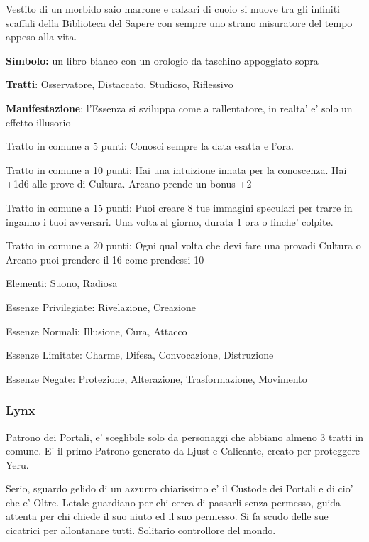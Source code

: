 \documentclass[a4paper,11pt,twoside,openany]{dndbook}
\begin{document}
{Vestito di un morbido saio marrone e calzari di cuoio si muove tra gli infiniti scaffali della Biblioteca del Sapere con sempre uno strano misuratore del tempo appeso alla vita.

\textbf{Simbolo:} un libro bianco con un orologio da taschino appoggiato
sopra

\textbf{Tratti}: Osservatore, Distaccato, Studioso, Riflessivo

\textbf{Manifestazione}: l'Essenza si sviluppa come a rallentatore, in realta' e' solo un effetto illusorio

\bigskip

Tratto in comune a 5 punti: Conosci sempre la data esatta e l'ora.

Tratto in comune a 10 punti: Hai una intuizione innata per la conoscenza. Hai +1d6 alle prove di Cultura. Arcano prende un bonus +2

Tratto in comune a 15 punti: Puoi creare 8 tue immagini speculari per trarre in inganno i tuoi avversari. Una volta al giorno, durata 1 ora o finche' colpite.

Tratto in comune a 20 punti: Ogni qual volta che devi fare una provadi Cultura o Arcano puoi prendere il 16 come prendessi 10

\bigskip

Elementi: Suono, Radiosa

\bigskip

Essenze Privilegiate: Rivelazione, Creazione

Essenze Normali: Illusione, Cura, Attacco

Essenze Limitate: Charme, Difesa, Convocazione, Distruzione

Essenze Negate: Protezione, Alterazione, Trasformazione, Movimento

\subsubsection{Lynx}

\label{lynx}

Patrono dei Portali, e' sceglibile solo da personaggi che abbiano almeno 3 tratti in comune. E' il primo Patrono generato da Ljust e Calicante, creato per proteggere Yeru.

Serio, sguardo gelido di un azzurro chiarissimo e' il Custode dei Portali e di cio' che e' Oltre. Letale guardiano per chi cerca di passarli senza permesso, guida attenta per chi chiede il suo aiuto ed il suo permesso. Si fa scudo delle sue cicatrici per allontanare tutti. 
Solitario controllore del mondo.

}
\end{document}
